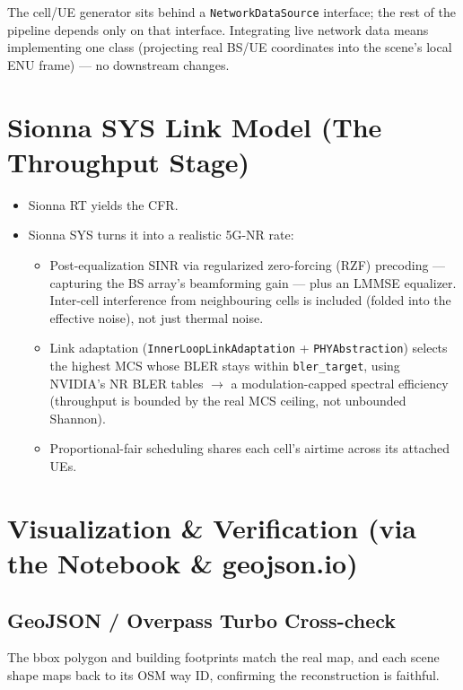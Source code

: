 \documentclass[11pt]{article}
\begin{document}
The cell/UE generator sits behind a \texttt{NetworkDataSource} interface; the rest
of the pipeline depends only on that interface. Integrating live network data means
implementing one class (projecting real BS/UE coordinates into the scene's local
ENU frame) --- no downstream changes.

\section{Sionna SYS Link Model (The Throughput Stage)}

\begin{itemize}[leftmargin=*]
  \item Sionna RT yields the CFR.
  \item Sionna SYS turns it into a realistic 5G-NR rate:
  \begin{itemize}
    \item Post-equalization SINR via regularized zero-forcing (RZF) precoding ---
    capturing the BS array's beamforming gain --- plus an LMMSE equalizer.
    Inter-cell interference from neighbouring cells is included (folded into the
    effective noise), not just thermal noise.
    \item Link adaptation (\texttt{InnerLoopLinkAdaptation} +
    \texttt{PHYAbstraction}) selects the highest MCS whose BLER stays within
    \texttt{bler_target}, using NVIDIA's NR BLER tables $\rightarrow$ a
    modulation-capped spectral efficiency (throughput is bounded by the real MCS
    ceiling, not unbounded Shannon).
    \item Proportional-fair scheduling shares each cell's airtime across its
    attached UEs.
  \end{itemize}
\end{itemize}

\section{Visualization \& Verification (via the Notebook \& geojson.io)}

\subsection{GeoJSON / Overpass Turbo Cross-check}
The bbox polygon and building footprints match the real map, and each scene shape
maps back to its OSM way ID, confirming the reconstruction is faithful.
\end{document}
